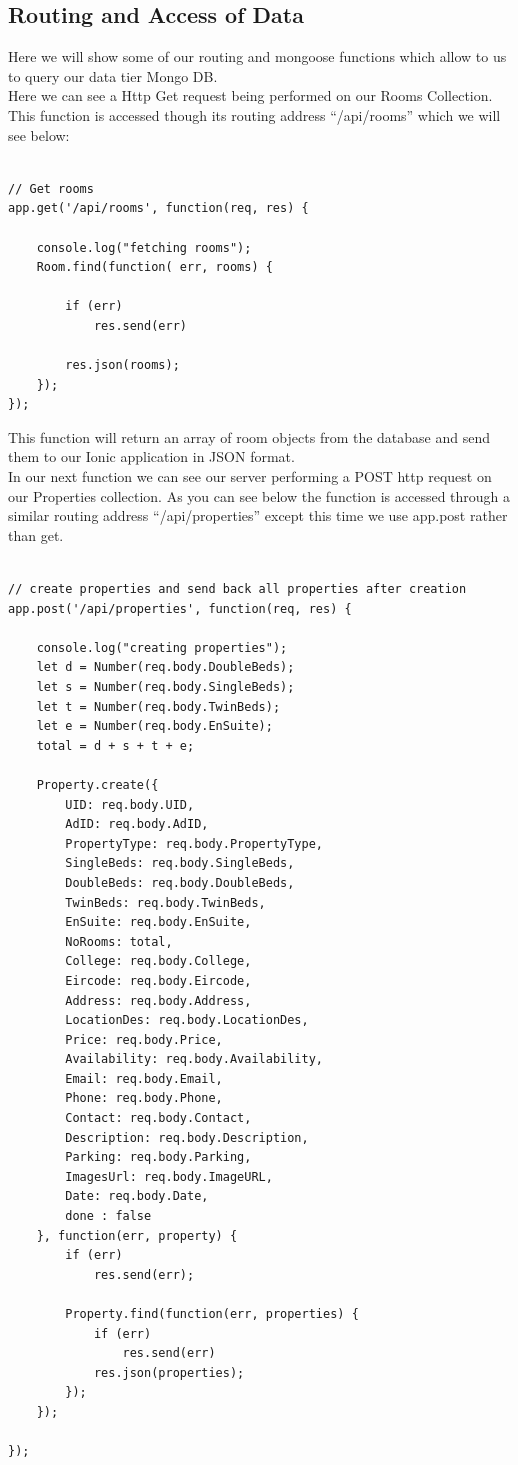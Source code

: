 \subsection{Routing and Access of Data}

Here we will show some of our routing and mongoose functions which allow to us to query our data tier Mongo DB. \\

Here we can see a Http Get request being performed on our Rooms Collection. This function is accessed though its routing address “/api/rooms” which we will see below:\\

\begin{verbatim}

// Get rooms
app.get('/api/rooms', function(req, res) {

	console.log("fetching rooms");
	Room.find(function( err, rooms) {

		if (err)
			res.send(err)

		res.json(rooms); 
	});
});

\end{verbatim}


This function will return an array of room objects from the database and send them to our Ionic application in JSON format.\\


In our next function we can see our server performing a POST http request on our Properties collection. As you can see below the function is accessed through a similar routing address “/api/properties” except this time we use app.post rather than get. \\

\begin{verbatim}

// create properties and send back all properties after creation
app.post('/api/properties', function(req, res) {

	console.log("creating properties");
	let d = Number(req.body.DoubleBeds);
	let s = Number(req.body.SingleBeds);
	let t = Number(req.body.TwinBeds);
	let e = Number(req.body.EnSuite);
	total = d + s + t + e;

	Property.create({
		UID: req.body.UID,
		AdID: req.body.AdID,
		PropertyType: req.body.PropertyType,
		SingleBeds: req.body.SingleBeds,
		DoubleBeds: req.body.DoubleBeds,
		TwinBeds: req.body.TwinBeds,
		EnSuite: req.body.EnSuite,
		NoRooms: total,
		College: req.body.College,
		Eircode: req.body.Eircode,
		Address: req.body.Address,
		LocationDes: req.body.LocationDes,
		Price: req.body.Price,
		Availability: req.body.Availability,
		Email: req.body.Email,
		Phone: req.body.Phone,
		Contact: req.body.Contact,
		Description: req.body.Description,
		Parking: req.body.Parking,
		ImagesUrl: req.body.ImageURL,
		Date: req.body.Date,
		done : false
	}, function(err, property) {
		if (err)
			res.send(err);

		Property.find(function(err, properties) {
			if (err)
				res.send(err)
			res.json(properties);
		});
	});

});

\end{verbatim}

